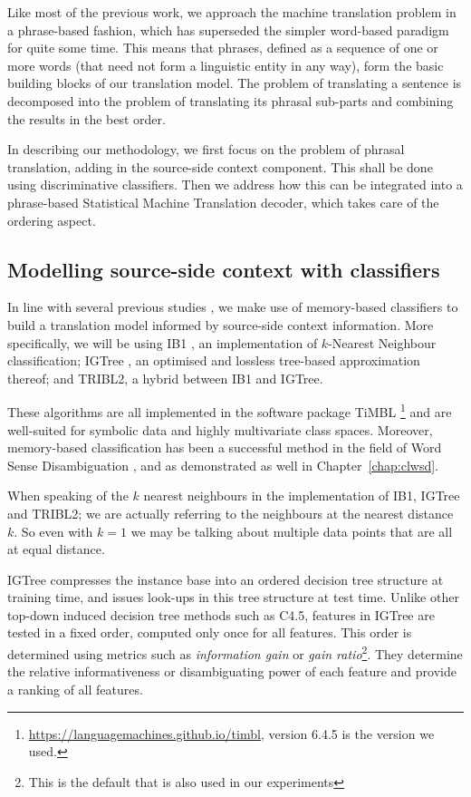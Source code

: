 Like most of the previous work, we approach the machine translation
problem in a phrase-based fashion, which has superseded the simpler word-based
paradigm for quite some time. This means that phrases, defined as a
sequence of one or more words (that need not form a linguistic entity in any
way), form the basic building blocks of our translation model. The problem of
translating a sentence is decomposed into the problem of translating its phrasal
sub-parts and combining the results in the best order.

In describing our methodology, we first focus on the problem of phrasal
translation, adding in the source-side context component. This shall be done
using discriminative classifiers. Then we address how this can be integrated into a
phrase-based Statistical Machine Translation decoder, which takes care of
the ordering aspect.


\subsection{Modelling source-side context with classifiers}

In line with several previous studies \citep{Rejwanul+11,PBMBMT,
  Stroppa+07,MARKERBASED}, we make use of memory-based classifiers to
build a translation model informed by source-side context
information. More specifically, we will be using IB1 \citep{IB1}, an
implementation of $k$-Nearest Neighbour classification; IGTree
\citep{IGTree}, an optimised and lossless tree-based approximation
thereof; and TRIBL2, a hybrid between IB1 and IGTree.

These algorithms are all implemented in the software package TiMBL
\citep{TIMBL}\footnote{\url{https://languagemachines.github.io/timbl}, version 6.4.5 is the
version we used.} and are well-suited for symbolic data and highly multivariate
class spaces.  Moreover, memory-based classification has been a successful
method in the field of Word Sense Disambiguation \citep{SENSEVAL2}, and as
demonstrated as well in Chapter~\ref{chap:clwsd}.

When speaking of the $k$ nearest neighbours in the implementation of IB1,
IGTree and TRIBL2; we are actually referring to the neighbours at the nearest
distance $k$. So even with $k=1$ we may be talking about multiple data points
that are all at equal distance.

IGTree compresses the instance base into an ordered decision tree structure at
training time, and issues look-ups in this tree structure at test time. Unlike
other top-down induced decision tree methods such as C4.5, features in IGTree
are tested in a fixed order, computed only once for all features. This order is
determined using metrics such as \emph{information gain} or \emph{gain
ratio}\footnote{This is the default that is also used in our experiments}. They
determine the relative informativeness or disambiguating power of each feature
and provide a ranking of all features.

